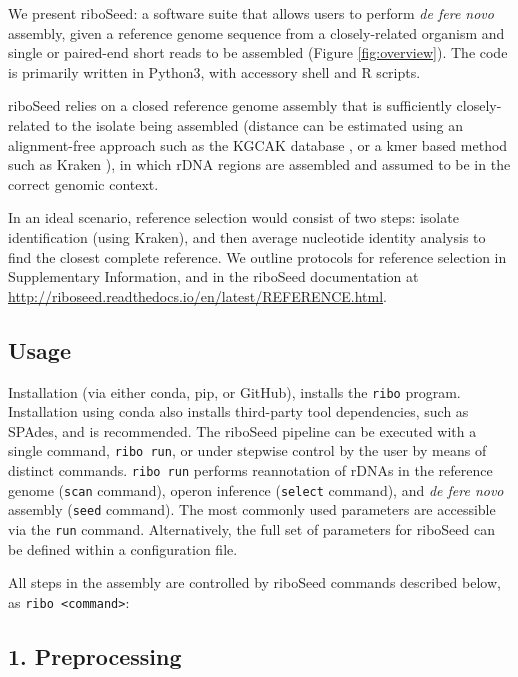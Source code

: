 We present riboSeed: a software suite that allows users to perform \textit{de fere novo} assembly, given a reference genome sequence from a closely-related organism and single or paired-end short reads to be assembled (Figure \ref{fig:overview}). The code is primarily written in Python3, with accessory shell and R scripts.


riboSeed relies on a closed reference genome assembly that is sufficiently closely-related to the isolate being assembled (distance can be estimated using an alignment-free approach such as the KGCAK database \cite{Wang2015b}, or a kmer based method such as Kraken \cite{Wood2014}), in which rDNA regions are assembled and assumed to be in the correct genomic context.

In an ideal scenario, reference selection would consist of two steps:  isolate identification (using Kraken), and then average nucleotide identity analysis to find the closest complete reference. We outline protocols for reference selection in Supplementary Information, and in the riboSeed documentation at \url{http://riboseed.readthedocs.io/en/latest/REFERENCE.html}.

\subsection*{Usage}
Installation (via either conda, pip, or GitHub), installs the \texttt{ribo} program. Installation using conda also installs third-party tool dependencies, such as SPAdes, and is recommended. The riboSeed pipeline can be executed with a single command, \texttt{ribo run}, or under stepwise control by the user by means of distinct commands. \texttt{ribo run} performs reannotation of rDNAs in the reference genome (\texttt{scan} command), operon inference (\texttt{select} command), and \textit{de fere novo} assembly (\texttt{seed} command).  The most commonly used parameters are accessible via the \texttt{run} command. Alternatively, the full set of parameters for riboSeed can be defined within a configuration file.

All steps in the assembly are controlled by riboSeed commands described below, as \texttt{ribo <command>}:

\subsection*{1. Preprocessing}

